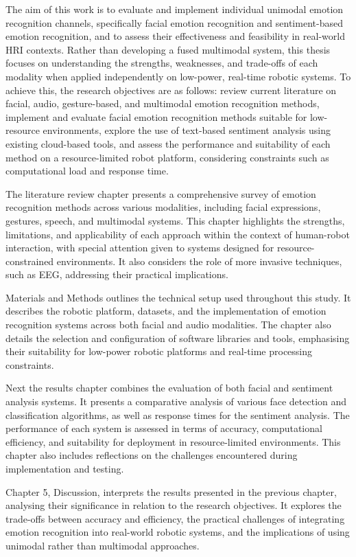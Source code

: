 The aim of this work is to evaluate and implement individual unimodal emotion recognition channels, specifically facial emotion recognition and sentiment-based emotion recognition, and to assess their effectiveness and feasibility in real-world HRI contexts. Rather than developing a fused multimodal system, this thesis focuses on understanding the strengths, weaknesses, and trade-offs of each modality when applied independently on low-power, real-time robotic systems. To achieve this, the research objectives are as follows: review current literature on facial, audio, gesture-based, and multimodal emotion recognition methods, implement and evaluate facial emotion recognition methods suitable for low-resource environments, explore the use of text-based sentiment analysis using existing cloud-based tools, and assess the performance and suitability of each method on a resource-limited robot platform, considering constraints such as computational load and response time.

The literature review chapter presents a comprehensive survey of emotion recognition methods across various modalities, including facial expressions, gestures, speech, and multimodal systems. This chapter highlights the strengths, limitations, and applicability of each approach within the context of human-robot interaction, with special attention given to systems designed for resource-constrained environments. It also considers the role of more invasive techniques, such as EEG, addressing their practical implications.

Materials and Methods outlines the technical setup used throughout this study. It describes the robotic platform, datasets, and the implementation of emotion recognition systems across both facial and audio modalities. The chapter also details the selection and configuration of software libraries and tools, emphasising their suitability for low-power robotic platforms and real-time processing constraints.

Next the results chapter combines the evaluation of both facial and sentiment analysis systems. It presents a comparative analysis of various face detection and classification algorithms, as well as response times for the sentiment analysis. The performance of each system is assessed in terms of accuracy, computational efficiency, and suitability for deployment in resource-limited environments. This chapter also includes reflections on the challenges encountered during implementation and testing.

Chapter 5, Discussion, interprets the results presented in the previous chapter, analysing their significance in relation to the research objectives. It explores the trade-offs between accuracy and efficiency, the practical challenges of integrating emotion recognition into real-world robotic systems, and the implications of using unimodal rather than multimodal approaches.

